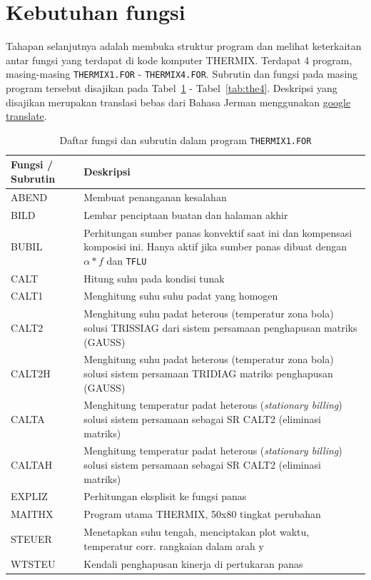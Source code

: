 \documentclass[a4paper,11pt]{report}
\renewcommand{\tablename}{Tabel}
\begin{document}
\section{Kebutuhan fungsi}
Tahapan selanjutnya adalah membuka struktur program dan melihat keterkaitan antar fungsi yang terdapat di kode komputer THERMIX. Terdapat 4 program, masing-masing \texttt{THERMIX1.FOR} - \texttt{THERMIX4.FOR}. Subrutin dan fungsi pada masing program tersebut disajikan pada \tablename~\ref{tab:the1} - \tablename~\ref{tab:the4}. Deskripsi yang disajikan merupakan translasi bebas dari Bahasa Jerman menggunakan \href{https://translate.google.com/}{google translate}.

\begin{table}[h!]
  \caption{Daftar fungsi dan subrutin dalam program \texttt{THERMIX1.FOR}}
  \label{tab:the1}

  \begin{center}
    \begin{tabular}{p{3cm}|p{10cm}}
    \toprule
       Fungsi / Subrutin & Deskripsi\\ \midrule
       ABEND & Membuat penanganan kesalahan \\
       BILD & Lembar penciptaan buatan dan halaman akhir \\
       BUBIL & Perhitungan sumber panas konvektif saat ini dan kompensasi komposisi ini. Hanya aktif jika sumber panas dibuat dengan $\alpha * f$ dan \texttt{TFLU} \\
       CALT & Hitung suhu pada kondisi tunak \\
       CALT1 & Menghitung suhu suhu padat yang homogen \\
       CALT2 & Menghitung suhu padat heterous (temperatur zona bola) solusi TRISSIAG dari sistem persamaan penghapusan matriks (GAUSS) \\
       CALT2H & Menghitung suhu padat heterous (temperatur zona bola) solusi sistem persamaan TRIDIAG matriks penghapusan (GAUSS) \\
       CALTA & Menghitung temperatur padat heterous (\textit{stationary billing}) solusi sistem persamaan sebagai SR CALT2 (eliminasi matriks) \\
       CALTAH & Menghitung temperatur padat heterous (\textit{stationary billing}) solusi sistem persamaan sebagai SR CALT2 (eliminasi matriks) \\
       EXPLIZ & Perhitungan eksplisit ke fungsi panas \\
       MAITHX & Program utama THERMIX, 50x80 tingkat perubahan \\
       STEUER & Menetapkan suhu tengah, menciptakan plot waktu, temperatur corr. rangkaian dalam arah y \\ 
       WTSTEU & Kendali penghapusan kinerja di pertukaran panas \\
       \bottomrule
    \end{tabular}
  \end{center}
\end{table}
\end{document}
